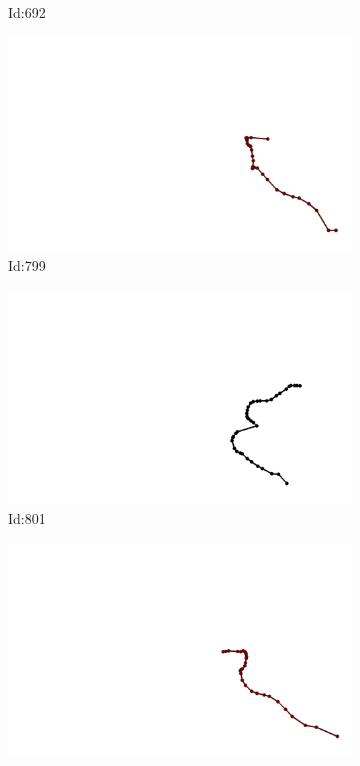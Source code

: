 \documentclass[12pt,twoside]{report}
\begin{document}
\begin{figure}
\begin{subfigure}[b]{0.20\textwidth}
\caption{Id:692}
\end{subfigure}
\begin{subfigure}[b]{0.20\textwidth}
\centering
\includegraphics[width=\textwidth]{../../trajectories/799.png}
\caption{Id:799}
\end{subfigure}
\begin{subfigure}[b]{0.20\textwidth}
\centering
\includegraphics[width=\textwidth]{../../trajectories/801.png}
\caption{Id:801}
\end{subfigure}
\begin{subfigure}[b]{0.20\textwidth}
\centering
\includegraphics[width=\textwidth]{../../trajectories/890.png}

\end{subfigure}
\end{figure}
\end{document}
